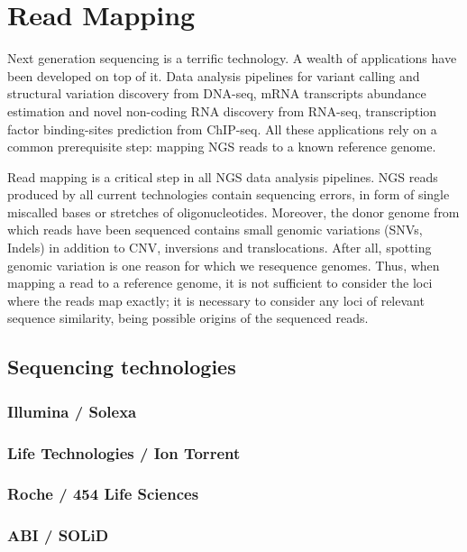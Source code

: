 \chapter{Read Mapping}

Next generation sequencing is a terrific technology.
A wealth of applications have been developed on top of it.
Data analysis pipelines for variant calling and structural variation discovery from DNA-seq, mRNA transcripts abundance estimation and novel non-coding RNA discovery from RNA-seq, transcription factor binding-sites prediction from ChIP-seq.
All these applications rely on a common prerequisite step: mapping NGS reads to a known reference genome.

Read mapping is a critical step in all NGS data analysis pipelines.
NGS reads produced by all current technologies contain sequencing errors, in form of single miscalled bases or stretches of oligonucleotides.
Moreover, the donor genome from which reads have been sequenced contains small genomic variations (SNVs, Indels) in addition to CNV, inversions and translocations.
After all, spotting genomic variation is one reason for which we resequence genomes.
Thus, when mapping a read to a reference genome, it is not sufficient to consider the loci where the reads map exactly; it is necessary to consider any loci of relevant sequence similarity, being possible origins of the sequenced reads.


\section{Sequencing technologies}
\subsection{Illumina / Solexa}
\subsection{Life Technologies / Ion Torrent}
\subsection{Roche / 454 Life Sciences}
\subsection{ABI / SOLiD}


